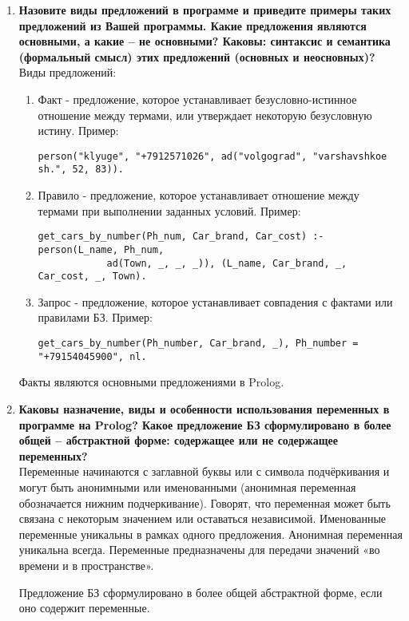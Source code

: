 \begin{enumerate}
    \item \textbf{Назовите виды предложений в программе и приведите примеры таких предложений из Вашей программы. Какие предложения являются основными, а какие – не основными?  Каковы: синтаксис и семантика (формальный смысл) этих предложений (основных и неосновных)?}\\
    Виды предложений:
    \begin{enumerate}
    	\item Факт - предложение, которое устанавливает безусловно-истинное отношение между термами, или утверждает некоторую безусловную истину. Пример:
\begin{lstlisting}[style = Prolog-pygsty] 
person("klyuge", "+7912571026", ad("volgograd", "varshavshkoe sh.", 52, 83)).
\end{lstlisting}
    	\item Правило - предложение, которое устанавливает отношение между термами при выполнении заданных условий. Пример:
\begin{lstlisting}[style = Prolog-pygsty] 
get_cars_by_number(Ph_num, Car_brand, Car_cost) :- person(L_name, Ph_num,
    		ad(Town, _, _, _)), (L_name, Car_brand, _, Car_cost, _, Town).
\end{lstlisting}
    	\item Запрос - предложение, которое устанавливает совпадения с фактами или правилами БЗ. Пример:
\begin{lstlisting}[style = Prolog-pygsty] 
get_cars_by_number(Ph_number, Car_brand, _), Ph_number = "+79154045900", nl.
\end{lstlisting}
    \end{enumerate}
	Факты являются основными предложениями в Prolog.
	
    \item \textbf{Каковы назначение, виды и особенности использования переменных в программе на Prolog? Какое предложение БЗ сформулировано в более общей – абстрактной форме: содержащее или не содержащее переменных?}\\
   	Переменные начинаются с заглавной буквы или с символа подчёркивания и могут быть анонимными или именованными (анонимная переменная обозначается нижним подчеркивание). Говорят, что переменная может быть связана с некоторым значением или оставаться независимой. Именованные переменные уникальны в рамках одного предложения. Анонимная переменная уникальна всегда. Переменные предназначены для передачи значений «во времени и в пространстве». 
   	
   	Предложение БЗ сформулировано в более общей абстрактной форме, если оно содержит переменные.
    

\end{enumerate}
